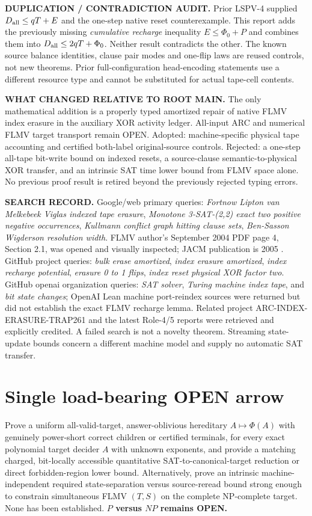 \documentclass[11pt]{article}
\begin{document}
\noindent\textbf{DUPLICATION / CONTRADICTION AUDIT.} Prior LSPV-4 supplied
$D_{\rm all}\le qT+E$ and the one-step native reset counterexample.
This report adds the previously missing \emph{cumulative recharge}
inequality $E\le\Phi_0+P$ and combines them into
$D_{\rm all}\le2qT+\Phi_0$. Neither result contradicts the other.
The known source balance identities, clause pair modes and one-flip
laws are reused controls, not new theorems. Prior full-configuration
head-encoding statements use a different resource type and cannot
be substituted for actual tape-cell contents.

\noindent\textbf{WHAT CHANGED RELATIVE TO ROOT MAIN.} The only
mathematical addition is a properly typed amortized repair of native
FLMV index erasure in the auxiliary XOR activity ledger.
All-input ARC and numerical FLMV target transport remain OPEN.
Adopted: machine-specific physical tape accounting and certified
both-label original-source controls. Rejected: a one-step all-tape
bit-write bound on indexed resets, a source-clause semantic-to-physical
XOR transfer, and an intrinsic SAT time lower bound from FLMV space
alone. No previous proof result is retired beyond the previously
rejected typing errors.

\noindent\textbf{SEARCH RECORD.} Google/web primary queries:
\emph{Fortnow Lipton van Melkebeek Viglas indexed tape erasure},
\emph{Monotone 3-SAT-(2,2) exact two positive negative occurrences},
\emph{Kullmann conflict graph hitting clause sets},
\emph{Ben-Sasson Wigderson resolution width}. FLMV author's
September 2004 PDF page 4, Section 2.1, was opened and visually
inspected; JACM publication is 2005 \cite{FLMV}.
GitHub project queries:
\emph{bulk erase amortized}, \emph{index erasure amortized},
\emph{index recharge potential}, \emph{erasure 0 to 1 flips},
\emph{index reset physical XOR factor two}.
GitHub openai organization queries:
\emph{SAT solver}, \emph{Turing machine index tape}, and
\emph{bit state changes}; OpenAI Lean machine port-reindex sources
were returned but did not establish the exact FLMV recharge lemma.
Related project ARC-INDEX-ERASURE-TRAP261 and the latest Role-4/5
reports were retrieved and explicitly credited. A failed search is
not a novelty theorem. Streaming state-update bounds
\cite{Jayaram2024} concern a different machine model and supply
no automatic SAT transfer.

\section{Single load-bearing OPEN arrow}
Prove a uniform all-valid-target, answer-oblivious hereditary
$A\mapsto\Phi(A)$ with genuinely power-short correct children or
certified terminals, for every exact polynomial target decider $A$
with unknown exponents, and provide a matching charged,
bit-locally accessible quantitative SAT-to-canonical-target
reduction or direct forbidden-region lower bound.
Alternatively, prove an intrinsic machine-independent required
state-separation versus source-reread bound strong enough to
constrain simultaneous FLMV $(T,S)$ on the complete NP-complete
target. None has been established. \textbf{$P$ versus $NP$ remains OPEN.}
\end{document}
